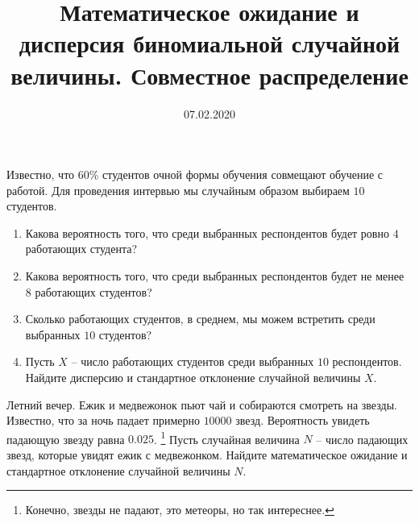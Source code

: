 \documentclass[a4paper, 12pt]{article}
\title{Математическое ожидание и дисперсия биномиальной случайной величины. 
Совместное распределение}
\date{07.02.2020}
\newcommand{\E}{$\text{E}$}
\newcommand{\D}{$\text{D}$}
\begin{document}
\begin{problem}
Известно, что $60$\% студентов очной формы обучения совмещают 
обучение с работой. Для проведения интервью мы случайным 
образом выбираем $10$ студентов.
\begin{enumerate}
\item Какова вероятность того, что среди выбранных респондентов 
будет ровно $4$ работающих студента?
\item Какова вероятность того, что среди выбранных респондентов 
будет не менее $8$ работающих студентов?
\item Сколько работающих студентов, в среднем, мы можем встретить 
среди выбранных $10$ студентов?
\item Пусть $X$ -- число работающих студентов среди выбранных $10$ 
респондентов. Найдите дисперсию и стандартное отклонение случайной 
величины $X$.
\end{enumerate}
\end{problem}

\begin{problem}
Летний вечер. Ежик и медвежонок пьют чай и собираются смотреть на звезды. 
Известно, что за ночь падает примерно $10000$ звезд. 
Вероятность увидеть падающую звезду равна $0.025$. 
\footnote{Конечно, звезды не падают, это метеоры, но так интереснее.}
Пусть случайная величина $N$ – число падающих звезд, которые увидят ежик 
с медвежонком. Найдите математическое ожидание и стандартное отклонение 
случайной величины $N$. 
\end{problem}

\end{document}
